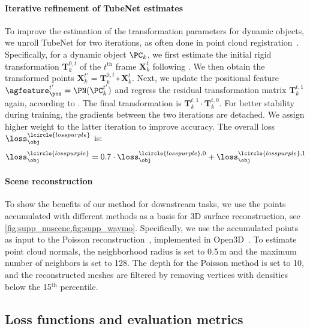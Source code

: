 \paragraph{Iterative refinement of TubeNet estimates}
To improve the estimation of the transformation parameters for dynamic objects, we unroll TubeNet for two iterations, as often done in point cloud registration~\cite{yew2020rpm,gojcic2020multiview}. Specifically, for a dynamic object $\PC_k$, we first estimate the initial rigid transformation $\mathbf{T}_k^{0, t}$ of the $t^\text{th}$ frame $\mathbf{X}_k^t$ following . We then obtain the transformed points $\mathbf{X}_k^{t'} = \mathbf{T}_k^{0, t} \circ \mathbf{X}_k^t$. Next, we update the positional feature $\agfeature_\pos^{t'} = \PN(\PC_k^{t'})$ and regress the residual transformation matrix $\mathbf{T}_k^{t, 1}$ again, according to . The final transformation is $\mathbf{T}_k^{t, 1}\cdot\mathbf{T}_k^{t, 0}$. For better stability during training, the gradients between the two iterations are detached. We assign higher weight to the latter iteration to improve accuracy. The overall loss $\loss_\obj^\lcircle{losspurple}$ is:
\begin{equation}
    \loss_\obj^\lcircle{losspurple} = 0.7\cdot \loss_\obj^{\lcircle{losspurple},0} +  \loss_\obj^{\lcircle{losspurple},1}
\end{equation}

\paragraph{Scene reconstruction}
To show the benefits of our method for downstream tasks, we use the points accumulated with different methods as a basis for 3D surface reconstruction, see \cref{fig:supp_nuscene,fig:supp_waymo}. Specifically, we use the accumulated points as input to the Poisson reconstruction~\cite{kazhdan2006poisson}, implemented in Open3D~\cite{Zhou2018}. To estimate point cloud normals, the neighborhood radius is set to 0.5$\,$m and the maximum number of neighbors is set to 128. The depth for the Poisson method is set to 10, and the reconstructed meshes are filtered by removing vertices with densities below the 15$^\text{th}$ percentile. 

\subsection{Loss functions and evaluation metrics}
\label{sec:supp_loss}
